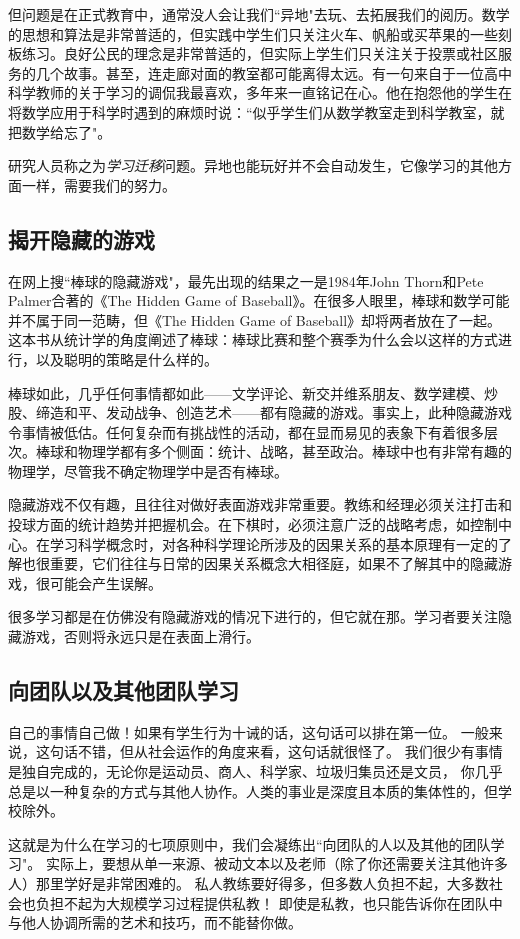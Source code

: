 但问题是在正式教育中，通常没人会让我们``异地"去玩、去拓展我们的阅历。数学的思想和算法是非常普适的，但实践中学生们只关注火车、帆船或买苹果的一些刻板练习。良好公民的理念是非常普适的，但实际上学生们只关注关于投票或社区服务的几个故事。甚至，连走廊对面的教室都可能离得太远。有一句来自于一位高中科学教师的关于学习的调侃我最喜欢，多年来一直铭记在心。他在抱怨他的学生在将数学应用于科学时遇到的麻烦时说：``似乎学生们从数学教室走到科学教室，就把数学给忘了"。

研究人员称之为\textit{学习迁移}问题。异地也能玩好并不会自动发生，它像学习的其他方面一样，需要我们的努力。

\subsection*{揭开隐藏的游戏}
在网上搜``棒球的隐藏游戏"，最先出现的结果之一是1984年John Thorn和Pete Palmer合著的《The Hidden Game of Baseball》。在很多人眼里，棒球和数学可能并不属于同一范畴，但《The Hidden Game of Baseball》却将两者放在了一起。这本书从统计学的角度阐述了棒球：棒球比赛和整个赛季为什么会以这样的方式进行，以及聪明的策略是什么样的。

棒球如此，几乎任何事情都如此——文学评论、新交并维系朋友、数学建模、炒股、缔造和平、发动战争、创造艺术——都有隐藏的游戏。事实上，此种隐藏游戏令事情被低估。任何复杂而有挑战性的活动，都在显而易见的表象下有着很多层次。棒球和物理学都有多个侧面：统计、战略，甚至政治。棒球中也有非常有趣的物理学，尽管我不确定物理学中是否有棒球。

隐藏游戏不仅有趣，且往往对做好表面游戏非常重要。教练和经理必须关注打击和投球方面的统计趋势并把握机会。在下棋时，必须注意广泛的战略考虑，如控制中心。在学习科学概念时，对各种科学理论所涉及的因果关系的基本原理有一定的了解也很重要，它们往往与日常的因果关系概念大相径庭，如果不了解其中的隐藏游戏，很可能会产生误解。

很多学习都是在仿佛没有隐藏游戏的情况下进行的，但它就在那。学习者要关注隐藏游戏，否则将永远只是在表面上滑行。

\subsection*{向团队以及其他团队学习}
自己的事情自己做！如果有学生行为十诫的话，这句话可以排在第一位。
一般来说，这句话不错，但从社会运作的角度来看，这句话就很怪了。
我们很少有事情是独自完成的，无论你是运动员、商人、科学家、垃圾归集员还是文员，
你几乎总是以一种复杂的方式与其他人协作。人类的事业是深度且本质的集体性的，但学校除外。

这就是为什么在学习的七项原则中，我们会凝练出``向团队的人以及其他的团队学习"。
实际上，要想从单一来源、被动文本以及老师（除了你还需要关注其他许多人）那里学好是非常困难的。
私人教练要好得多，但多数人负担不起，大多数社会也负担不起为大规模学习过程提供私教！
即使是私教，也只能告诉你在团队中与他人协调所需的艺术和技巧，而不能替你做。

